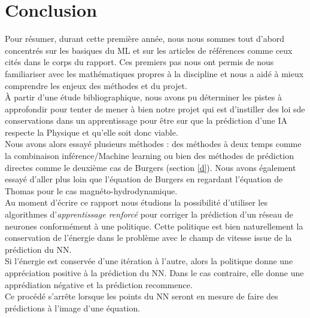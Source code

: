 \documentclass[a4paper,12pt]{article}
\newcommand\bk{\color{black}}
\newcommand\navy{\color{navy}}
\numberwithin{equation}{section} %
\begin{document}
\navy \section{Conclusion} \bk
\noindent Pour résumer, durant cette première année, nous nous sommes tout d'abord concentrés sur les basiques du ML et sur les articles de références comme ceux cités dans le corps du rapport. Ces premiers pas nous ont permis de nous familiariser avec les mathématiques propres à la discipline et nous a aidé à mieux comprendre les enjeux des méthodes et du projet.\\
À partir d'une étude bibliographique, nous avons pu déterminer les pistes à approfondir pour tenter de mener à bien notre projet qui est d'instiller des loi sde conservations dans un apprentissage pour être sur que la prédiction d'une IA respecte la Physique et qu'elle soit donc viable.\\
Nous avons alors essayé plusieurs méthodes : des méthodes à deux temps comme la combinaison inférence/Machine learning ou bien des méthodes de prédiction directes comme le deuxième cas de Burgers (section \eqref{d}). Nous avons également essayé d'aller plus loin que l'équation de Burgers en regardant l'équation de Thomas pour le cas magnéto-hydrodynamique.\\
	
\noindent Au moment d'écrire ce rapport nous étudions la possibilité d'utiliser les algorithmes d'\textit{apprentissage renforcé} pour corriger la prédiction d'un réseau de neurones conformément à une politique. Cette politique est bien naturellement la conservation de l'énergie dans le problème avec le champ de vitesse issue de la prédiction du NN. \\
Si l'énergie est conservée d'une itération à l'autre, alors la politique donne une appréciation positive à la prédiction du NN. Dans le cas contraire, elle donne une apprédiation négative et la prédiction recommence.\\
Ce procédé s'arrête lorsque les points du NN seront en mesure de faire des prédictions à l'image d'une équation.\\




\pagebreak



\end{document}
